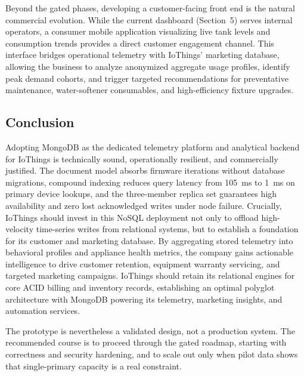 \documentclass[11pt,a4paper]{article}
\begin{document}
Beyond the gated phases, developing a customer-facing front end is the natural commercial evolution. While the current dashboard (Section~5) serves internal operators, a consumer mobile application visualizing live tank levels and consumption trends provides a direct customer engagement channel. This interface bridges operational telemetry with IoThings' marketing database, allowing the business to analyze anonymized aggregate usage profiles, identify peak demand cohorts, and trigger targeted recommendations for preventative maintenance, water-softener consumables, and high-efficiency fixture upgrades.

\subsection{Conclusion}
Adopting MongoDB as the dedicated telemetry platform and analytical backend for IoThings is technically sound, operationally resilient, and commercially justified. The document model absorbs firmware iterations without database migrations, compound indexing reduces query latency from 105~ms to 1~ms on primary device lookups, and the three-member replica set guarantees high availability and zero lost acknowledged writes under node failure. Crucially, IoThings should invest in this NoSQL deployment not only to offload high-velocity time-series writes from relational systems, but to establish a foundation for its customer and marketing database. By aggregating stored telemetry into behavioral profiles and appliance health metrics, the company gains actionable intelligence to drive customer retention, equipment warranty servicing, and targeted marketing campaigns. IoThings should retain its relational engines for core ACID billing and inventory records, establishing an optimal polyglot architecture with MongoDB powering its telemetry, marketing insights, and automation services.

The prototype is nevertheless a validated design, not a production system. The recommended course is to proceed through the gated roadmap, starting with correctness and security hardening, and to scale out only when pilot data shows that single-primary capacity is a real constraint.
\end{document}
